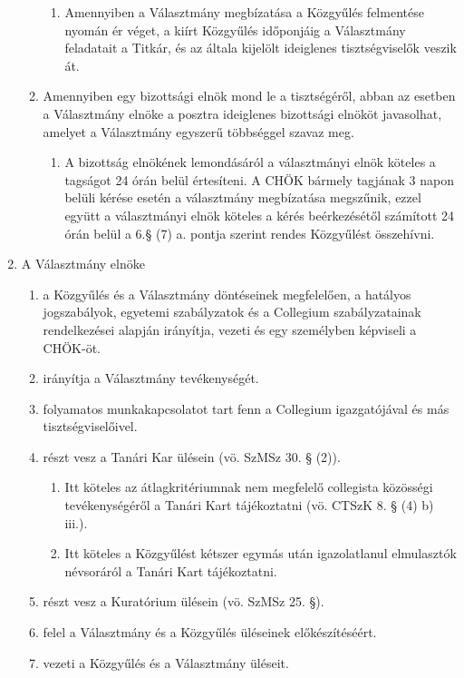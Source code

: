 \documentclass{../styles/rulebook}
\begin{document}
\begin{enumerate}
\begin{enumerate}
		\begin{enumerate}
			\item Amennyiben a Választmány megbízatása a Közgyűlés felmentése nyomán ér véget, a kiírt Közgyűlés időponjáig a Választmány feladatait a Titkár, és az általa kijelölt ideiglenes tisztségviselők veszik át.
		\end{enumerate}
		\item Amennyiben egy bizottsági elnök mond le a tisztségéről, abban az esetben a Választmány elnöke a posztra ideiglenes bizottsági elnököt javasolhat, amelyet a Választmány egyszerű többséggel szavaz meg.
		\begin{enumerate}
			\item A bizottság elnökének lemondásáról a választmányi elnök köteles a tagságot 24 órán belül értesíteni. A CHÖK bármely tagjának 3 napon belüli kérése esetén a választmány megbízatása megszűnik, ezzel együtt a választmányi elnök köteles a kérés beérkezésétől számított 24 órán belül a 6.§ (7) a. pontja szerint rendes Közgyűlést összehívni.
		\end{enumerate}
	\end{enumerate}
	\item A Választmány elnöke
	\begin{enumerate}	
		\item a Közgyűlés és a Választmány döntéseinek megfelelően, a hatályos jogszabályok, egyetemi szabályzatok és a Collegium szabályzatainak rendelkezései alapján irányítja, vezeti és egy személyben képviseli a CHÖK-öt.
		\item irányítja a Választmány tevékenységét.
		\item folyamatos munkakapcsolatot tart fenn a Collegium igazgatójával és más tisztségviselőivel.
		\item részt vesz a Tanári Kar ülésein (vö. SzMSz 30. § (2)).
		\begin{enumerate}
			\item Itt köteles az átlagkritériumnak nem megfelelő collegista közösségi tevékenységéről a Tanári Kart tájékoztatni (vö. CTSzK 8. § (4) b) iii.).
            \item Itt köteles a Közgyűlést kétszer egymás után igazolatlanul elmulasztók névsoráról a Tanári Kart tájékoztatni.
		\end{enumerate}
		\item részt vesz a Kuratórium ülésein (vö. SzMSz 25. §).
        \item felel a Választmány és a Közgyűlés üléseinek előkészítéséért.
        \item vezeti a Közgyűlés és a Választmány üléseit.

\end{enumerate}
\end{enumerate}
\end{document}
